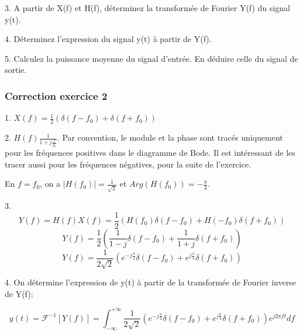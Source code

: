 \documentclass[11pt]{report}
\begin{document}
	\vspace{0.5\baselineskip}
	
	3. A partir de X(f) et H(f), déterminez la transformée de Fourier Y(f) du signal y(t).
	
	\vspace{0.5\baselineskip}
	
	4. Déterminez l'expression du signal y(t) à partir de Y(f).
	
	\vspace{0.5\baselineskip}
	
	5. Calculez la puissance moyenne du signal d'entrée. En déduire celle du signal de sortie.
	
	\vspace{1\baselineskip}	
	
	\subsubsection{Correction exercice 2}
	
	1. $X(f)=\frac{1}{2}(\delta(f-f_{0})+\delta(f+f_{0}))$
	
	
	2. $H(f)$$\frac{1}{1+j\frac{f}{f_{0}}}$. Par convention, le module et la phase sont tracés uniquement pour les fréquences positives dans le diagramme de Bode. Il est intéressant de les tracer aussi pour les fréquences négatives, pour la suite de l'exercice.
	
	En $f= f_{0}$, on a $|H(f_{0})|=\frac{1}{\sqrt{2}}$ et $Arg(H(f_{0}))=-\frac{\pi}{4}$.
	
	3. \begin{equation*}
	Y(f)=H(f)X(f)=\frac{1}{2}(H(f_{0})\delta(f-f_{0})+H(-f_{0})\delta(f+f_{0}))
	\end{equation*}
	\begin{equation*}
	Y(f)=\frac{1}{2}(\frac{1}{1-j}\delta(f-f_{0})+\frac{1}{1+j}\delta(f+f_{0}))
	\end{equation*}
	\begin{equation*}
	Y(f)=\frac{1}{2\sqrt{2}}(e^{-j\frac{\pi}{4}}\delta(f-f_{0})+e^{j\frac{\pi}{4}}\delta(f+f_{0}))
	\end{equation*}

	
	4. On détermine l'expression de y(t) à partir de la transformée de Fourier inverse de Y(f):
	
	\begin{equation*}
	y(t)=\mathcal{F}^{-1}[Y(f)]=\int_{-\infty}^{+\infty}\frac{1}{2\sqrt{2}}(e^{-j\frac{\pi}{4}}\delta(f-f_{0})+e^{j\frac{\pi}{4}}\delta(f+f_{0}))e^{j2\pi ft}df
	\end{equation*}
	
\end{document}
